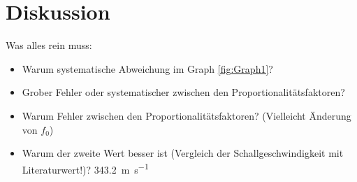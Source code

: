 
\section{Diskussion}
\label{sec:Diskussion}

Was alles rein muss:
\begin{itemize}
	\item Warum systematische Abweichung im Graph \ref{fig:Graph1}?
	\item Grober Fehler oder systematischer zwischen den Proportionalitätsfaktoren?
	\item Warum Fehler zwischen den Proportionalitätsfaktoren? (Vielleicht Änderung von $f_0$)
	\item Warum der zweite Wert besser ist (Vergleich der Schallgeschwindigkeit mit Literaturwert!)? \SI{343.2}{\meter\per\second} \cite{c}
	
\end{itemize}